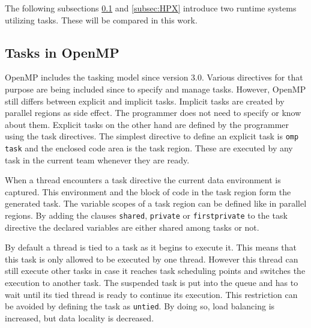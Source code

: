 	
  The following subsections \ref{subsec:OpenMP} and \ref{subsec:HPX} introduce two runtime systems utilizing tasks.
  These will be compared in this work.


\subsection{Tasks in OpenMP}
\label{subsec:OpenMP}
  OpenMP includes the tasking model since version 3.0.
  Various directives for that purpose are being included since to specify and manage  tasks.
  However, OpenMP still differs between explicit and implicit tasks.
  Implicit tasks are created by parallel regions as side effect.
  The programmer does not need to specify or know about them.
  Explicit tasks on the other hand are defined by the programmer using the task directives.
  The simplest directive to define an explicit task is \texttt{omp task} and the enclosed code area is the task region.
  These are executed by any task in the current team whenever they are ready.~\cite{Ayguade.2009}~\cite{LaGrone.2011}


  When a thread encounters a task directive the current data environment is captured.
  This environment and the block of code in the task region form the generated task.
  The variable scopes of a task region can be defined like in parallel regions.
  By adding the clauses \texttt{shared}, \texttt{private} or \texttt{firstprivate} to the task directive the declared variables are either shared among tasks or not.~\cite{Duran.2008}
  
  
  By default a thread is tied to a task as it begins to execute it.
  This means that this task is only allowed to be executed by one thread.
  However this thread can still execute other tasks in case it reaches task scheduling points and switches the execution to another task.
  The suspended task is put into the queue and has to wait until its tied thread is ready to continue its execution.
  This restriction can be avoided by defining the task as \texttt{untied}.
  By doing so, load balancing is increased, but data locality is decreased.~\cite{Ayguade.2009}~\cite{LaGrone.2011}



